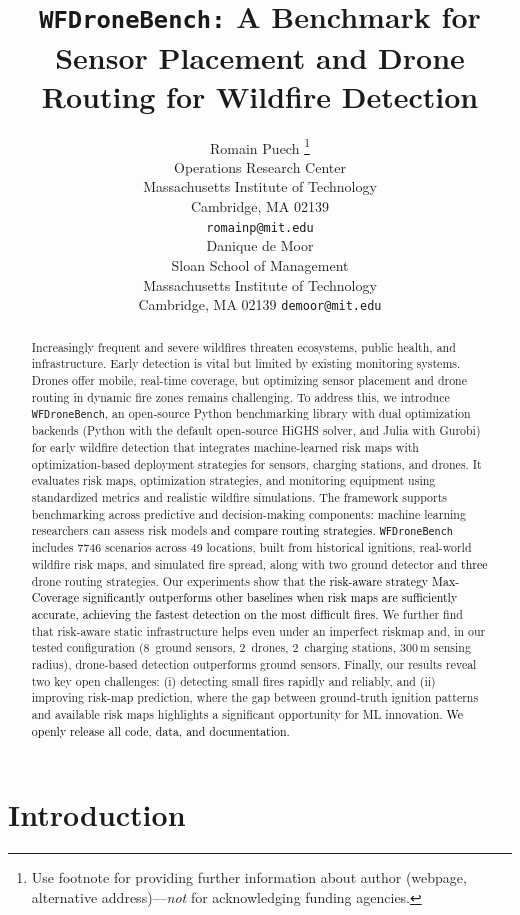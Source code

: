 \documentclass{article}
\title{\texttt{WFDroneBench:} A Benchmark for Sensor Placement and Drone Routing for Wildfire Detection}
\author{%
  Romain Puech \thanks{Use footnote for providing further information
    about author (webpage, alternative address)---\emph{not} for acknowledging
    funding agencies.} \\
  Operations Research Center\\
  Massachusetts Institute of Technology\\
  Cambridge, MA 02139 \\
  \texttt{romainp@mit.edu} \\
  Danique de Moor \\
  Sloan School of Management \\
  Massachusetts Institute of Technology \\
  Cambridge, MA 02139
  \texttt{demoor@mit.edu} \\
}
\newcommand{\layoutsNo}{49}
\newcommand{\scenariosNo}{7746}
\newcommand{\rev}[1]{\textcolor{black}{#1}}
\newcommand{\blue}[1]{\textcolor{black}{#1}}
\begin{document}
\maketitle

\begin{abstract}
Increasingly frequent and severe wildfires threaten ecosystems, public health, and infrastructure. Early detection is vital but limited by existing monitoring systems. Drones offer mobile, real-time coverage, but optimizing sensor placement and drone routing in dynamic fire zones remains challenging. To address this, we introduce \texttt{WFDroneBench}, an open-source Python benchmarking library with dual optimization backends (Python with the default open-source HiGHS solver, and Julia with Gurobi) for early wildfire detection that integrates machine-learned risk maps with optimization-based deployment strategies for sensors, charging stations, and drones. It evaluates risk maps, optimization strategies, and monitoring equipment using standardized metrics and realistic wildfire simulations. The framework supports benchmarking across predictive and decision-making components: machine learning researchers can assess risk models \rev{and compare routing strategies}. \texttt{WFDroneBench} includes \scenariosNo{} scenarios across \layoutsNo{} locations, built from historical ignitions, real-world wildfire risk maps, and simulated fire spread, along with two ground detector and \blue{three} drone routing strategies. Our experiments show that \blue{the risk-aware strategy Max-Coverage significantly outperforms other baselines when risk maps
are sufficiently accurate, achieving the fastest detection on the most difficult fires.} We further find that risk-aware static infrastructure helps even under an imperfect
riskmap and, in our tested configuration (8~ground sensors, 2~drones, 2~charging stations, 300\,m sensing radius), drone-based detection outperforms ground sensors. Finally, our results reveal two key open challenges: (i) detecting small fires rapidly and reliably, and (ii) improving risk-map prediction, where the gap between ground-truth ignition patterns and available risk maps highlights a significant opportunity for ML innovation. \blue{We openly release all code, data, and documentation.}
\end{abstract}

\section{Introduction}
\end{document}
